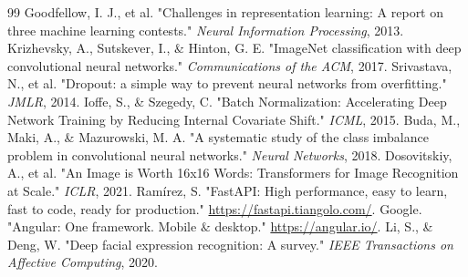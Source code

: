 \documentclass[a4paper,12pt]{article}
\begin{document}
\newpage
\begin{thebibliography}{99}
    Goodfellow, I. J., et al. "Challenges in representation learning: A report on three machine learning contests." \textit{Neural Information Processing}, 2013.
    Krizhevsky, A., Sutskever, I., \& Hinton, G. E. "ImageNet classification with deep convolutional neural networks." \textit{Communications of the ACM}, 2017.
    Srivastava, N., et al. "Dropout: a simple way to prevent neural networks from overfitting." \textit{JMLR}, 2014.
    Ioffe, S., \& Szegedy, C. "Batch Normalization: Accelerating Deep Network Training by Reducing Internal Covariate Shift." \textit{ICML}, 2015.
    Buda, M., Maki, A., \& Mazurowski, M. A. "A systematic study of the class imbalance problem in convolutional neural networks." \textit{Neural Networks}, 2018.
    Dosovitskiy, A., et al. "An Image is Worth 16x16 Words: Transformers for Image Recognition at Scale." \textit{ICLR}, 2021.
    Ramírez, S. "FastAPI: High performance, easy to learn, fast to code, ready for production." \url{https://fastapi.tiangolo.com/}.
    Google. "Angular: One framework. Mobile $\&$ desktop." \url{https://angular.io/}.
    Li, S., \& Deng, W. "Deep facial expression recognition: A survey." \textit{IEEE Transactions on Affective Computing}, 2020.
\end{thebibliography}
\end{document}

